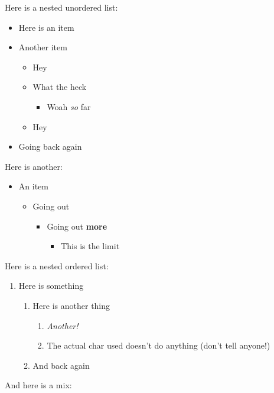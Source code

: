 \documentclass[10pt]{extarticle}
\date{}
\begin{document}

Here is a nested unordered list:

\begin{itemize}
\item Here is an item
\item Another item
\begin{itemize}
\item Hey
\item What the heck
\begin{itemize}
\item Woah \textit{so} far
\end{itemize}
\item Hey
\end{itemize}
\item Going back again
\end{itemize}

Here is another:

\begin{itemize}
\item An item
\begin{itemize}
\item Going out 
\begin{itemize}
\item Going out \textbf{more}
\begin{itemize}
\item This is the limit
\end{itemize}
\end{itemize}
\end{itemize}
\end{itemize}

Here is a nested ordered list:

\begin{enumerate}
\item Here is something
\begin{enumerate}
\item Here is another thing
\begin{enumerate}
\item \textit{Another!}
\item The actual char used doesn't do anything (don't tell anyone!)
\end{enumerate}
\item And back again
\end{enumerate}
\end{enumerate}

And here is a mix:
\end{document}
